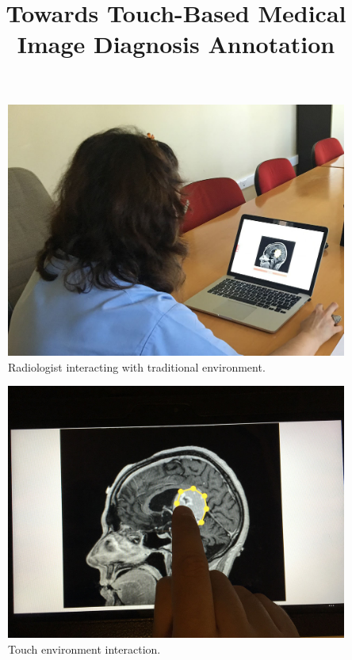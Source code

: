 \documentclass{sigchi}
\begin{document}
\title{Towards Touch-Based Medical Image Diagnosis Annotation}

\maketitle

\begin{figure}[h]
\centering
\includegraphics[width=1.0\columnwidth]{header_1.jpg}
\caption{Radiologist interacting with traditional environment.}
\label{fig:Fig1}
\end{figure}

\begin{figure}[h]
\centering
\includegraphics[width=1.0\columnwidth]{header_2.jpg}
\caption{Touch environment interaction.}
\label{fig:Fig2}
\end{figure}
\end{document}
